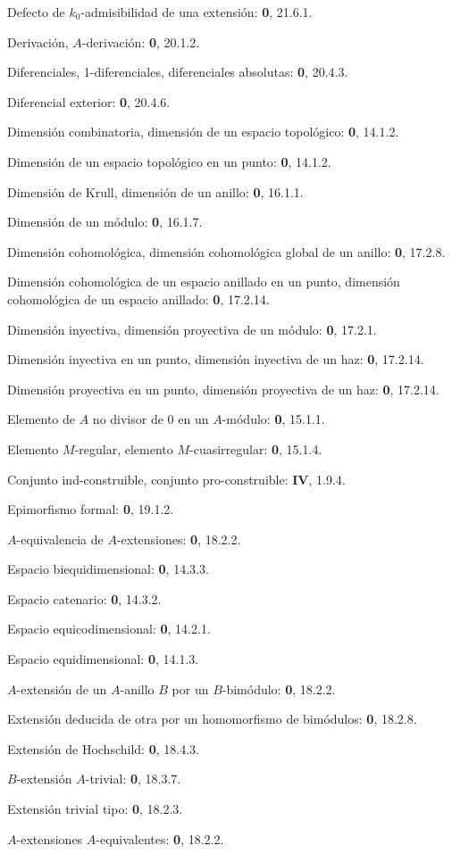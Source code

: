 Defecto de $k_0$-admisibilidad de una extensión: \textbf{0}, 21.6.1.\par
Derivación, $A$-derivación: \textbf{0}, 20.1.2.\par
Diferenciales, 1-diferenciales, diferenciales absolutas: \textbf{0}, 20.4.3.\par
Diferencial exterior: \textbf{0}, 20.4.6.\par
Dimensión combinatoria, dimensión de un espacio topológico: \textbf{0}, 14.1.2.\par
Dimensión de un espacio topológico en un punto: \textbf{0}, 14.1.2.\par
Dimensión de Krull, dimensión de un anillo: \textbf{0}, 16.1.1.\par
Dimensión de un módulo: \textbf{0}, 16.1.7.\par
Dimensión cohomológica, dimensión cohomológica global de un anillo: \textbf{0}, 17.2.8.\par
Dimensión cohomológica de un espacio anillado en un punto, dimensión cohomológica de un espacio anillado: \textbf{0}, 17.2.14.\par

\clearpage
{}
Dimensión inyectiva, dimensión proyectiva de un módulo: \textbf{0}, 17.2.1.\par
Dimensión inyectiva en un punto, dimensión inyectiva de un haz: \textbf{0}, 17.2.14.\par
Dimensión proyectiva en un punto, dimensión proyectiva de un haz: \textbf{0}, 17.2.14.\par

Elemento de $A$ no divisor de 0 en un $A$-módulo: \textbf{0}, 15.1.1.\par
Elemento $M$-regular, elemento $M$-cuasirregular: \textbf{0}, 15.1.4.\par
Conjunto ind-construible, conjunto pro-construible: \textbf{IV}, 1.9.4.\par
Epimorfismo formal: \textbf{0}, 19.1.2.\par
$A$-equivalencia de $A$-extensiones: \textbf{0}, 18.2.2.\par
Espacio biequidimensional: \textbf{0}, 14.3.3.\par
Espacio catenario: \textbf{0}, 14.3.2.\par
Espacio equicodimensional: \textbf{0}, 14.2.1.\par
Espacio equidimensional: \textbf{0}, 14.1.3.\par
$A$-extensión de un $A$-anillo $B$ por un $B$-bimódulo: \textbf{0}, 18.2.2.\par
Extensión deducida de otra por un homomorfismo de bimódulos: \textbf{0}, 18.2.8.\par
Extensión de Hochschild: \textbf{0}, 18.4.3.\par
$B$-extensión $A$-trivial: \textbf{0}, 18.3.7.\par
Extensión trivial tipo: \textbf{0}, 18.2.3.\par
$A$-extensiones $A$-equivalentes: \textbf{0}, 18.2.2.\par

